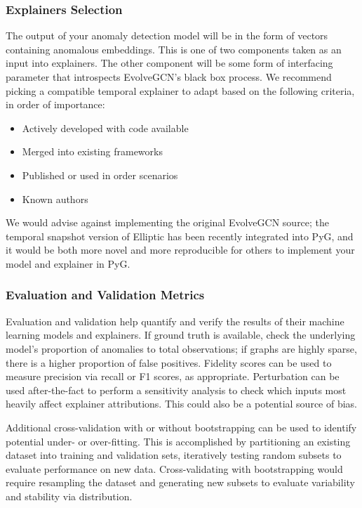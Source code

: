 \subsubsection{Explainers Selection}
The output of your anomaly detection model will be in the form of vectors containing anomalous embeddings. This is one of two components taken as an input into explainers. The other component will be some form of interfacing parameter that introspects EvolveGCN's black box process. We recommend picking a compatible temporal explainer to adapt based on the following criteria, in order of importance:

\begin{itemize}
    \item Actively developed with code available
    \item Merged into existing frameworks
    \item Published or used in order scenarios
    \item Known authors
\end{itemize}

We would advise against implementing the original EvolveGCN source; the temporal snapshot version of Elliptic has been recently integrated into PyG, and it would be both more novel and more reproducible for others to implement your model and explainer in PyG.

\subsubsection{Evaluation and Validation Metrics}
Evaluation and validation help quantify and verify the results of their machine learning models and explainers. If ground truth is available, check the underlying model's proportion of anomalies to total observations; if graphs are highly sparse, there is a higher proportion of false positives\cite{zhang_trustworthy_2022}. Fidelity scores can be used to measure precision via recall or F1 scores, as appropriate. Perturbation can be used after-the-fact to perform a sensitivity analysis to check which inputs most heavily affect explainer attributions. This could also be a potential source of bias.

Additional cross-validation with or without bootstrapping can be used to identify potential under- or over-fitting. This is accomplished by partitioning an existing dataset into training and validation sets, iteratively testing random subsets to evaluate performance on new data. Cross-validating with bootstrapping would require resampling the dataset and generating new subsets to evaluate variability and stability via distribution\cite{kauermann_statistical_2021}.

